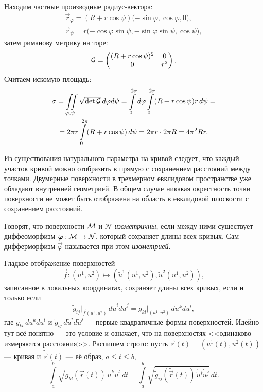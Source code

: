 \begin{solution}
	Находим частные производные радиус-вектора:
	\begin{gather*}
		\vec{r}_\varphi = (R + r\cos\psi)\big({-\sin\varphi}, \cos\varphi, 0\big),\\
		\vec{r}_\psi = r\big({-\cos\varphi\sin\psi}, -\sin\varphi\sin\psi, \cos\psi\big),
	\end{gather*}
	затем риманову метрику на торе:
	\[
		\mathcal{G} =
		\begin{pmatrix}
			(R + r\cos\psi)^2 & 0\\
			0 & r^2
		\end{pmatrix}.
	\]
	Считаем искомую площадь:
	\begin{multline*}
		\sigma = \iint\limits_{\varphi, \psi}\sqrt{\det\mathcal{G}}\,d\varphi d\psi = \int\limits_0^{2\pi}d\varphi\int\limits_0^{2\pi}(R + r\cos\psi)r\,d\psi =\\ = 2\pi r\int\limits_0^{2\pi}(R + r\cos\psi)\,d\psi = 2\pi r \cdot 2\pi R = 4\pi^2 Rr.
	\end{multline*}
\end{solution}

Из существования натурального параметра на кривой следует, что каждый участок кривой можно отобразить в прямую с сохранением расстояний между точками. Двумерные поверхности в трехмерном евклидовом пространстве уже обладают внутренней геометрией. В общем случае никакая окрестность точки поверхности не может быть отображена на область в евклидовой плоскости с сохранением расстояний.

\begin{definition}
	Говорят, что поверхности $\mathcal{M}$ и $\mathcal{N}$ \textit{изометричны}, если между ними существует диффеоморфизм $\boldsymbol{\varphi}\colon \mathcal{M} \to \mathcal{N}$, который сохраняет длины всех кривых. Сам дифферморфизм $\vec{\varphi}$ называется при этом \textit{изометрией}.
\end{definition}

\noindent
Гладкое отображение поверхностей
\[
	\vec{f}\colon (u^1, u^2) \mapsto (\widetilde{u}^1(u^1, u^2), \widetilde{u}^2(u^1, u^2)),
\]
записанное в локальных координатах, сохраняет длины всех кривых, если и только если
\begin{equation} \label{eq:Isometry}
	\widetilde{g}_{ij}\big|_{\vec{f}(u^1, u^2)}\,d\widetilde{u}^id\widetilde{u}^j = g_{kl}\big|_{(u^1, u^2)}\,du^kdu^l,
\end{equation}
где $g_{kl}\,du^kdu^l$ и $\widetilde{g}_{ij}\,d\widetilde{u}^id\widetilde{u}^j$ --- первые квадратичные формы поверхностей. Идейно тут всё понятно --- это условие и означает, что на поверхностях <<одинаково измеряются расстояния>>. Распишем строго: пусть $\vec{r}(t) = (u^1(t), u^2(t))$ --- кривая и $\widetilde{\vec{r}}(t)$ --- её образ, $a \leqslant t \leqslant b$,
\[
	\int\limits_a^b\sqrt{g_{kl}(\vec{r}(t))\,\dot{u}^k\dot{u}^l}\,dt = \int\limits_a^b\sqrt{\widetilde{g}_{ij}(\widetilde{\vec{r}}(t))\,\dot{\widetilde{u}}{}^i\dot{\widetilde{u}}{}^j}\,dt.
\]

